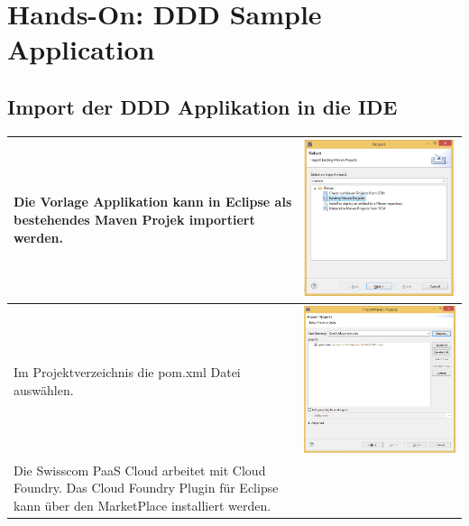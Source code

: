 \chapter{Hands-On: DDD Sample Application}
\section{Import der DDD Applikation in die IDE}
\begin{longtable}{| p{5cm} | p{11cm} |}
\hline
Die Vorlage Applikation kann in Eclipse als bestehendes Maven Projek importiert werden.
&\includegraphics[width=0.65\columnwidth, valign=T]{images/ddd_basic/1.png}
 \\ \hline
Im Projektverzeichnis die pom.xml Datei auswählen.
&\includegraphics[width=0.65\columnwidth, valign=T]{images/ddd_basic/2.png}
 \\ \hline
Die Swisscom PaaS Cloud arbeitet mit Cloud Foundry. Das Cloud Foundry Plugin für Eclipse kann über den MarketPlace installiert werden.

\end{longtable}
